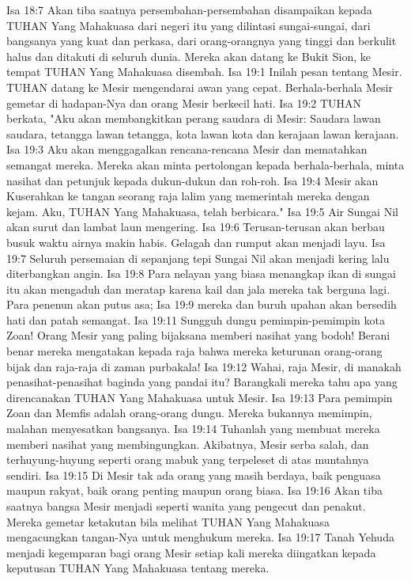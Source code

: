 Isa 18:7  Akan tiba saatnya persembahan-persembahan disampaikan kepada TUHAN Yang Mahakuasa dari negeri itu yang dilintasi sungai-sungai, dari bangsanya yang kuat dan perkasa, dari orang-orangnya yang tinggi dan berkulit halus dan ditakuti di seluruh dunia. Mereka akan datang ke Bukit Sion, ke tempat TUHAN Yang Mahakuasa disembah.
Isa 19:1  Inilah pesan tentang Mesir. TUHAN datang ke Mesir mengendarai awan yang cepat. Berhala-berhala Mesir gemetar di hadapan-Nya dan orang Mesir berkecil hati.
Isa 19:2  TUHAN berkata, "Aku akan membangkitkan perang saudara di Mesir: Saudara lawan saudara, tetangga lawan tetangga, kota lawan kota dan kerajaan lawan kerajaan.
Isa 19:3  Aku akan menggagalkan rencana-rencana Mesir dan mematahkan semangat mereka. Mereka akan minta pertolongan kepada berhala-berhala, minta nasihat dan petunjuk kepada dukun-dukun dan roh-roh.
Isa 19:4  Mesir akan Kuserahkan ke tangan seorang raja lalim yang memerintah mereka dengan kejam. Aku, TUHAN Yang Mahakuasa, telah berbicara."
Isa 19:5  Air Sungai Nil akan surut dan lambat laun mengering.
Isa 19:6  Terusan-terusan akan berbau busuk waktu airnya makin habis. Gelagah dan rumput akan menjadi layu.
Isa 19:7  Seluruh persemaian di sepanjang tepi Sungai Nil akan menjadi kering lalu diterbangkan angin.
Isa 19:8  Para nelayan yang biasa menangkap ikan di sungai itu akan mengaduh dan meratap karena kail dan jala mereka tak berguna lagi. Para penenun akan putus asa;
Isa 19:9  mereka dan buruh upahan akan bersedih hati dan patah semangat.
Isa 19:11  Sungguh dungu pemimpin-pemimpin kota Zoan! Orang Mesir yang paling bijaksana memberi nasihat yang bodoh! Berani benar mereka mengatakan kepada raja bahwa mereka keturunan orang-orang bijak dan raja-raja di zaman purbakala!
Isa 19:12  Wahai, raja Mesir, di manakah penasihat-penasihat baginda yang pandai itu? Barangkali mereka tahu apa yang direncanakan TUHAN Yang Mahakuasa untuk Mesir.
Isa 19:13  Para pemimpin Zoan dan Memfis adalah orang-orang dungu. Mereka bukannya memimpin, malahan menyesatkan bangsanya.
Isa 19:14  Tuhanlah yang membuat mereka memberi nasihat yang membingungkan. Akibatnya, Mesir serba salah, dan terhuyung-huyung seperti orang mabuk yang terpeleset di atas muntahnya sendiri.
Isa 19:15  Di Mesir tak ada orang yang masih berdaya, baik penguasa maupun rakyat, baik orang penting maupun orang biasa.
Isa 19:16  Akan tiba saatnya bangsa Mesir menjadi seperti wanita yang pengecut dan penakut. Mereka gemetar ketakutan bila melihat TUHAN Yang Mahakuasa mengacungkan tangan-Nya untuk menghukum mereka.
Isa 19:17  Tanah Yehuda menjadi kegemparan bagi orang Mesir setiap kali mereka diingatkan kepada keputusan TUHAN Yang Mahakuasa tentang mereka.
